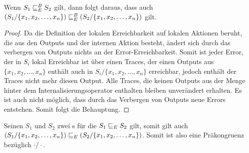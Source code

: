 \begin{prop}
  Wenn $S_1\sqsubseteq _E^B S_2$ gilt, dann folgt daraus, dass auch $(S_1/\{x_1,x_2,\dots
  ,x_n\})\sqsubseteq _E^B (S_2/\{x_1,x_2,\dots ,x_n\})$ gilt.
\end{prop}

\begin{proof}
  Da die Definition der lokalen Erreichbarkeit auf lokalen Aktionen beruht, die
  aus den Outputs und der internen Aktion besteht, ändert sich durch das
  verbergen von Outputs nichts an der Error-Erreichbarkeit. Somit ist jeder
  Error, der in $S_i$ lokal Erreichbar ist über einen Traces, der einen
  Outputs aus $\{x_1,x_2,\dots ,x_n\}$ enthält auch in $S_i/\{x_1,x_2,\dots
  ,x_n\}$ erreichbar, jedoch enthält der Traces nicht mehr diesen Output. Alle
  Traces, die keinen Outputs aus der Menge hinter dem Internalisierungsoperator
  enthalten bleiben unverändert erhalten. Es ist auch nicht möglich, dass durch
  das Verbergen von Outputs neue Errors entstehen. Somit folgt die Behauptung.
\end{proof}

\begin{satz}
  \label{satzPraeInternalisierung}
  Seinen $S_1$ und $S_2$ zwei \EIO{}s für die $S_1\sqsubseteq _E S_2$ gilt, somit gilt
  auch $(S_1/\{x_1,x_2,\dots ,x_n\})\sqsubseteq _E (S_2/\{x_1,x_2,\dots ,x_n\})$. Somit
  ist also \ERel{} eine Präkongruenz bezüglich $\cdot /\cdot$.
\end{satz}

